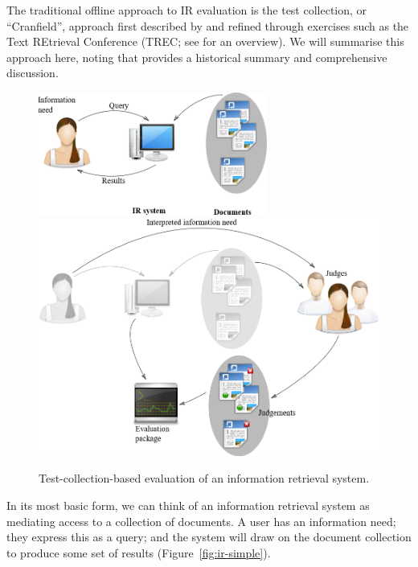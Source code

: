 The traditional offline approach to IR evaluation is the test collection, or ``Cranfield'', approach first described by \cite{cleverdon67} and refined through exercises such as the Text REtrieval Conference (TREC; see \cite{voor:trec05} for an overview).  We will summarise this approach here, noting that \cite{INR-009} provides a historical summary and comprehensive discussion.

\begin{figure}
	{
	\includegraphics[width=0.67\textwidth]{images/ir-model}
	\label{fig:ir-simple}
	}\vspace*{3em}
	{
	\includegraphics[width=\textwidth]{images/ir-model-with-judges}
	\label{fig:ir-with-judges}
	}\vspace*{3em}
	\caption{Test-collection-based evaluation of an information retrieval system.}
\end{figure}

In its most basic form, we can think of an information retrieval system as mediating access to a collection of documents. A user has an information need; they express this as a query; and the system will draw on the document collection to produce some set of results (Figure~\ref{fig:ir-simple}).

